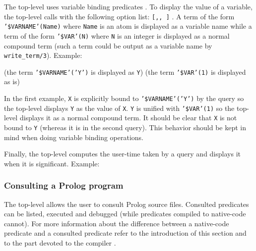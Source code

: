 The top-level uses variable binding predicates . To display the value of a variable, the top-level calls
 with the following option list:
\texttt{[,,
]} . A term of the
form \texttt{'\$VARNAME'(Name)} where \texttt{Name} is an atom is displayed
as a variable name while a term of the form \texttt{'\$VAR'(N)} where
\texttt{N} is an integer is displayed as a normal compound term (such a term
could be output as a variable name by \texttt{write\_term/3}). Example:

\begin{CodeTwoCols}
\SkipLine
{} {(the term \texttt{'\$VARNAME'('Y')} is displayed as \texttt{Y})}
 {(the term \texttt{'\$VAR'(1)} is displayed as is)}
\end{CodeTwoCols}

\begin{CodeTwoCols}
\SkipLine
{}
\end{CodeTwoCols}

In the first example, \texttt{X} is explicitly bound to
\texttt{'\$VARNAME'('Y')} by the query so the top-level displays \texttt{Y}
as the value of \texttt{X}. \texttt{Y} is unified with \texttt{'\$VAR'(1)} so
the top-level displays it as a normal compound term. It should be clear that
\texttt{X} is not bound to \texttt{Y} (whereas it is in the second
query). This behavior should be kept in mind when doing variable binding
operations.

Finally, the top-level computes the user-time  taken
by a query and displays it when it is significant. Example:

\begin{CodeTwoCols}
\SkipLine
{}
\SkipLine
{}
\end{CodeTwoCols}

\subsubsection{Consulting a Prolog program}
\label{Consulting-a-Prolog-program}
The top-level allows the user to consult Prolog source files. Consulted
predicates can be listed, executed and debugged (while predicates compiled
to native-code cannot). For more information about the difference between a
native-code predicate and a consulted predicate refer to the introduction of
this section  and to the part devoted
to the compiler .

